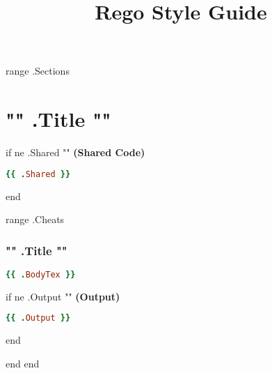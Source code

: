 \documentclass[twocolumn]{article}
\makeatletter
\renewcommand{\maketitle}{\bgroup\setlength{\parindent}{0pt}
  \textbf{\LARGE{\@title}}
}
\makeatother
\begin{document}
\title{Rego Style Guide}

\maketitle
\vspace{-1em}

{{ range .Sections }}
\section*{{ "{" }}{{ .Title }}{{ "}" }}

{{ if ne .Shared "" }}
\textbf{\tiny{(Shared Code)}}
\begin{lstlisting}[language=Ruby]
{{ .Shared }}
\end{lstlisting}
{{ end }}

{{ range .Cheats }}
\vspace{-1em}
\subsubsection*{{ "{" }}{{ .Title }}{{ "}" }}

\begin{lstlisting}[language=Ruby]
{{ .BodyTex }}
\end{lstlisting}


{{ if ne .Output "" }}
\textbf{\tiny{(Output)}}
\begin{lstlisting}[language=Ruby]
{{ .Output }}
\end{lstlisting}
{{ end }}

{{ end }}
{{ end }}
\end{document}
